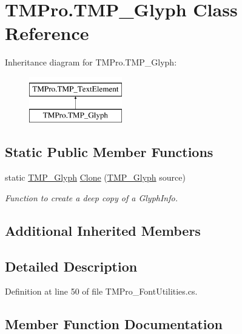 \hypertarget{class_t_m_pro_1_1_t_m_p___glyph}{}\section{T\+M\+Pro.\+T\+M\+P\+\_\+\+Glyph Class Reference}
\label{class_t_m_pro_1_1_t_m_p___glyph}
Inheritance diagram for T\+M\+Pro.\+T\+M\+P\+\_\+\+Glyph\+:\begin{figure}[H]
\begin{center}
\leavevmode
\includegraphics[height=2.000000cm]{class_t_m_pro_1_1_t_m_p___glyph}
\end{center}
\end{figure}
\subsection*{Static Public Member Functions}
\begin{DoxyCompactItemize}
\item 
static \mbox{\hyperlink{class_t_m_pro_1_1_t_m_p___glyph}{T\+M\+P\+\_\+\+Glyph}} \mbox{\hyperlink{class_t_m_pro_1_1_t_m_p___glyph_a15b77a3c26ae6ea55ba3e59a3c1c12be}{Clone}} (\mbox{\hyperlink{class_t_m_pro_1_1_t_m_p___glyph}{T\+M\+P\+\_\+\+Glyph}} source)
\begin{DoxyCompactList}\small\item\em Function to create a deep copy of a Glyph\+Info. \end{DoxyCompactList}\end{DoxyCompactItemize}
\subsection*{Additional Inherited Members}


\subsection{Detailed Description}


Definition at line 50 of file T\+M\+Pro\+\_\+\+Font\+Utilities.\+cs.



\subsection{Member Function Documentation}
\mbox{\label{class_t_m_pro_1_1_t_m_p___glyph_a15b77a3c26ae6ea55ba3e59a3c1c12be}} 
